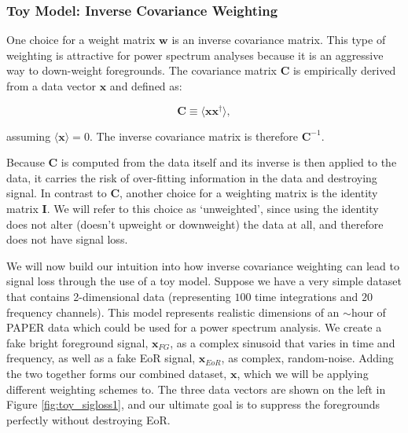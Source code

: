 \documentclass[preprint2,numberedappendix,tighten,twocolappendix]{aastex6}  %
\begin{document}
\subsubsection{Toy Model: Inverse Covariance Weighting}

One choice for a weight matrix $\textbf{w}$ is an inverse covariance matrix. This type of weighting is attractive for power spectrum analyses because it is an aggressive way to down-weight foregrounds. The covariance matrix $\textbf{C}$ is empirically derived from a data vector $\textbf{x}$ and defined as:

\begin{equation}
\textbf{C} \equiv \langle\textbf{xx}^{\dagger}\rangle,
\end{equation}

assuming $\langle\textbf{x}\rangle = 0$. The inverse covariance matrix is therefore $\textbf{C}^{-1}$.

Because $\textbf{C}$ is computed from the data itself and its inverse is then applied to the data, it carries the risk of over-fitting information in the data and destroying signal. In contrast to $\textbf{C}$, another choice for a weighting matrix is the identity matrix $\textbf{I}$. We will refer to this choice as `unweighted', since using the identity does not alter (doesn't upweight or downweight) the data at all, and therefore does not have signal loss.

We will now build our intuition into how inverse covariance weighting can lead to signal loss through the use of a toy model. Suppose we have a very simple dataset that contains 2-dimensional data (representing $100$ time integrations and $20$ frequency channels). This model represents realistic dimensions of an $\sim$hour of PAPER data which could be used for a power spectrum analysis. We create a fake bright foreground signal, $\textbf{x}_{FG}$, as a complex sinusoid that varies in time and frequency, as well as a fake EoR signal, $\textbf{x}_{EoR}$, as complex, random-noise. Adding the two together forms our combined dataset, $\textbf{x}$, which we will be applying different weighting schemes to. The three data vectors are shown on the left in Figure \ref{fig:toy_sigloss1}, and our ultimate goal is to suppress the foregrounds perfectly without destroying EoR.
\end{document}
